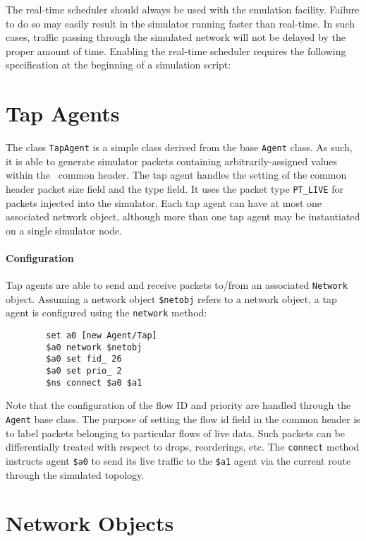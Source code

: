 The real-time scheduler should always be used with the emulation facility.
Failure to do so may easily result in the simulator running faster
than real-time.
In such cases, traffic passing through the simulated network will
not be delayed by the proper amount of time.
Enabling the real-time scheduler requires the
following specification at the beginning of a simulation script:

\section{Tap Agents}

The class {\tt TapAgent} is a simple class derived from the base
{\tt Agent} class.
As such, it is able to generate simulator packets containing
arbitrarily-assigned values within the \ns~common header.
The tap agent handles the setting of the common header packet
size field and the type field.  
It uses the packet type {\tt PT\_LIVE} for packets injected
into the simulator.
Each tap agent can have at most one associated network object, although
more than one tap agent may be instantiated on a single simulator node.

\paragraph{Configuration}
Tap agents are able to send and receive packets to/from an
associated {\tt Network} object.
Assuming a network object {\tt \$netobj} refers to a network
object, a tap agent is configured using the {\tt network} method:
\begin{verbatim}
        set a0 [new Agent/Tap]
        $a0 network $netobj
        $a0 set fid_ 26
        $a0 set prio_ 2
        $ns connect $a0 $a1
\end{verbatim}
Note that the configuration of the flow ID and priority are
handled through the {\tt Agent} base class.
The purpose of setting the flow id field in the common header
is to label packets belonging to particular flows of live data.
Such packets can be differentially treated with respect
to drops, reorderings, etc.
The {\tt connect} method instructs agent {\tt \$a0} to send
its live traffic to the {\tt \$a1} agent via the current
route through the simulated topology.

\section{Network Objects}
\label{sec:networkobj}

